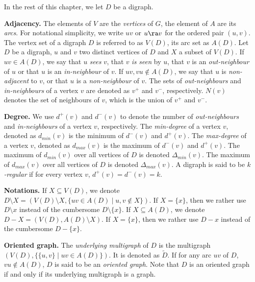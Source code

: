 \medskip

In the rest of this chapter, we let $D$ be a digraph.

\medskip

\textbf{Adjacency.}
The elements of $V$ are the \textit{vertices} of $G$, the element of $A$ are its \textit{arcs}. 
For notational simplicity, we write $uv$ or $u \ra v$ for the ordered pair $(u,v)$.
The vertex set of a digraph $D$ is referred to as $V(D)$, its arc set as $A(D)$.
Let $D$ be a digraph, $u$ and $v$ two distinct vertices of $D$ and $X$ a subset of $V(D)$.
If $uv \in A(D)$, we say that $u$ \emph{sees} $v$, that $v$ \emph{is seen} by $u$, that $v$ is an \emph{out-neighbour} of $u$ or that $u$ is an \emph{in-neighbour} of $v$. 
If $uv, vu \notin A(D)$, we say that $u$ is \emph{non-adjacent} to $v$, or that $u$ is a \emph{non-neighbour} of $v$.
The sets of \emph{out-neighbours} and \emph{in-neighbours} of a vertex $v$ are denoted as $v^+$ and $v^-$, respectively. $N(v)$ denotes the set of neighbours of $v$, which is the union of $v^+$ and $v^-$. 

\medskip

\textbf{Degree.}
We use $d^+(v)$ and $d^-(v)$ to denote the number of \emph{out-neighbours} and \emph{in-neighbours} of a vertex $v$, respectively. The \emph{min-degree} of a vertex $v$, denoted as $d_{min}(v)$ is the minimum of $d^{-}(v)$ and $d^{+}(v)$. The \emph{max-degree} of a vertex $v$, denoted as $d_{max}(v)$ is the maximum of $d^{-}(v)$ and $d^{+}(v)$. The maximum of $d_{min}(v)$ over all vertices of $D$ is denoted $\Delta_{min}(v)$. The maximum of $d_{max}(v)$ over all vertices of $D$ is denoted $\Delta_{max}(v)$.  
A digraph is said to be \emph{$k$-regular} if for every vertex $v$, $d^+(v)=d^-(v)=k$.

\medskip

\textbf{Notations.}
If $X \subseteq V(D)$, we denote $D \setminus X = (V(D) \setminus X, \{uv \in A(D) \mid u,v \notin X \})$. If $X = \{x\}$, then we rather use $D \setminus x$ instead of the cumbersome $D \setminus \{x\}$.
If $X \subseteq A(D)$, we denote $D - X = (V(D), A(D) \setminus X)$.
If $X = \{x\}$, then we rather use $D - x$ instead of the cumbersome $D - \{x\}$.

\medskip

\textbf{Oriented graph.}
The \emph{underlying multigraph} of $D$ is the multigraph $(V(D),\{\{u,v\} \mid uv \in A(D)\})$. It is denoted as $\tilde D$. If for any arc $uv$ of $D$, $vu \notin A(D)$, $D$ is said to be an \emph{oriented graph}. Note that $D$ is an oriented graph if and only if its underlying multigraph is a graph.


